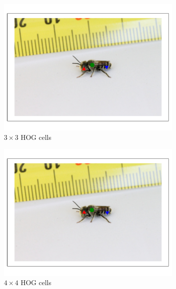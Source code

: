 \documentclass[11pt, oneside]{report}
\begin{document}
        \begin{figure}[p]
            \centering
            \begin{subfigure}[b]{0.3\textwidth}
                \centering
                \includegraphics[width=\textwidth]{hog3_3.pdf}
                \caption{$3\times3$ HOG cells}
            \end{subfigure}
            \begin{subfigure}[b]{0.3\textwidth}
                \centering
                \includegraphics[width=\textwidth]{hog4_3.pdf}
                \caption{$4\times4$ HOG cells}
            \end{subfigure}
            \begin{subfigure}[b]{0.3\textwidth}

\end{subfigure}
\end{figure}
\end{document}
